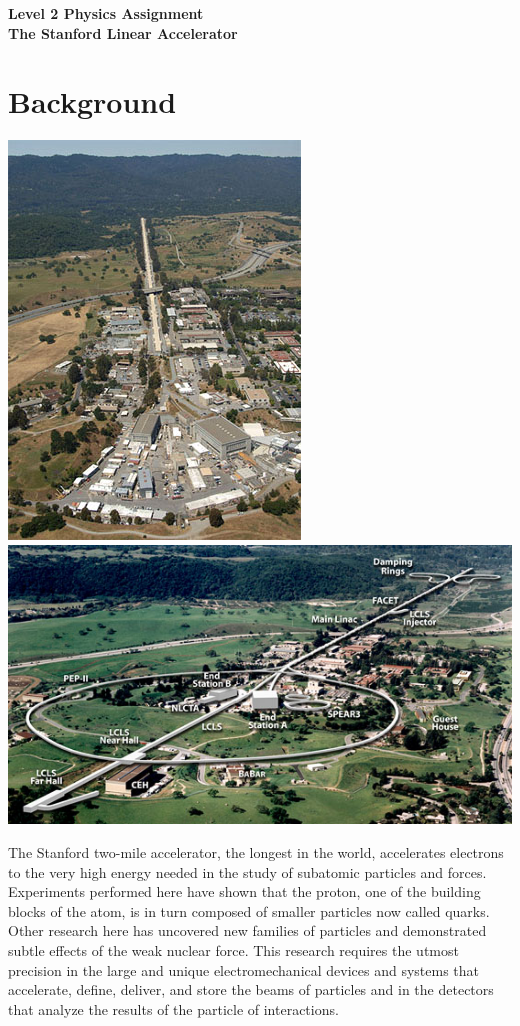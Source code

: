 \documentclass[a4paper]{exam}
\begin{document}
\begin{center}
  \huge{\textbf{Level 2 Physics Assignment}}\\
  \huge{\textbf{The Stanford Linear Accelerator}}
\end{center}

\section{Background}
\begin{center}
  \includegraphics[height=0.25\textheight]{slac1}
  \includegraphics[height=0.25\textheight]{slac2}
\end{center}
The Stanford two-mile accelerator, the longest in the world, accelerates electrons to the very high energy needed in the study of subatomic particles and forces. Experiments performed here have shown that the proton, one of the building blocks of the atom, is in turn composed of smaller particles now called quarks. Other research here has uncovered new families of particles and demonstrated subtle effects of the weak nuclear force. This research requires the utmost precision in the large and unique electromechanical devices and systems that accelerate, define, deliver, and store the beams of particles and in the detectors that analyze the results of the particle of interactions.
\end{document}

